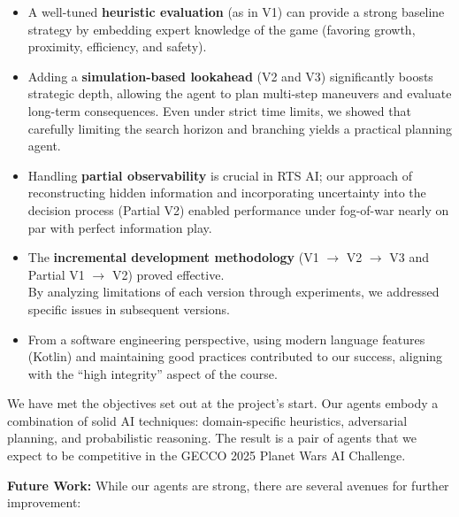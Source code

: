 \documentclass[conference]{IEEEtran}
\begin{document}
\begin{itemize}
\item A well-tuned \textbf{heuristic evaluation} (as in V1) can provide a strong baseline strategy by embedding expert knowledge of the game (favoring growth, proximity, efficiency, and safety).
\item Adding a \textbf{simulation-based lookahead} (V2 and V3) significantly boosts strategic depth, allowing the agent to plan multi-step maneuvers and evaluate long-term consequences. Even under strict time limits, we showed that carefully limiting the search horizon and branching yields a practical planning agent.
\item Handling \textbf{partial observability} is crucial in RTS AI; our approach of reconstructing hidden information and incorporating uncertainty into the decision process (Partial V2) enabled performance under fog-of-war nearly on par with perfect information play.
\item The \textbf{incremental development methodology} (V1 $\rightarrow$ V2 $\rightarrow$ V3 and Partial V1 $\rightarrow$ V2) proved effective.\\
By analyzing limitations of each version through experiments, we addressed specific issues in subsequent versions.
\item From a software engineering perspective, using modern language features (Kotlin) and maintaining good practices contributed to our success, aligning with the ``high integrity'' aspect of the course.
\end{itemize}

We have met the objectives set out at the project's start. Our agents embody a combination of solid AI techniques: domain-specific heuristics, adversarial planning, and probabilistic reasoning. The result is a pair of agents that we expect to be competitive in the GECCO 2025 Planet Wars AI Challenge.

\textbf{Future Work:} While our agents are strong, there are several avenues for further improvement:
\end{document}
